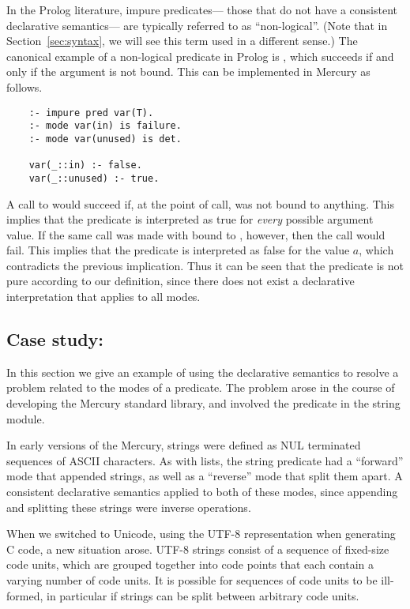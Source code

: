 In the Prolog literature, impure predicates---%
those that do not have a consistent declarative semantics---%
are typically referred to as ``non-logical\label{gi:non-logical}''.
(Note that in Section~\ref{sec:syntax},
we will see this term used in a different sense.)
The canonical example of a non-logical predicate in Prolog
is ,
which succeeds if and only if the argument is not bound.
This can be implemented in Mercury as follows.
\begin{verbatim}
    :- impure pred var(T).
    :- mode var(in) is failure.
    :- mode var(unused) is det.

    var(_::in) :- false.
    var(_::unused) :- true.
\end{verbatim}
A call to  would succeed if,
at the point of call,
 was not bound to anything.
This implies that the predicate is interpreted as true
for \emph{every} possible argument value.
If the same call was made with  bound to ,
however, then the call would fail.
This implies that the predicate is interpreted as false
for the value $a$,
which contradicts the previous implication.
Thus it can be seen that the predicate is not pure
according to our definition,
since there does not exist a declarative interpretation
that applies to all modes.


\subsection{Case study: }
\label{sec:purity-example}

In this section we give an example
of using the declarative semantics to resolve a problem
related to the modes of a predicate.
The problem arose in the course of developing the Mercury standard library,
and involved the  predicate in the string module.

In early versions of the Mercury,
strings were defined as NUL terminated sequences of ASCII characters.
As with lists,
the string  predicate had
a ``forward'' mode that appended strings,
as well as a ``reverse'' mode that split them apart.
A consistent declarative semantics applied to both of these modes,
since appending and splitting these strings
were inverse operations.

When we switched to Unicode,
using the UTF-8 representation when generating C code,
a new situation arose.
UTF-8 strings consist of a sequence of fixed-size code units,
which are grouped together into code points
that each contain a varying number of code units.
It is possible for sequences of code units to be ill-formed,
in particular if strings can be split between arbitrary code units.

